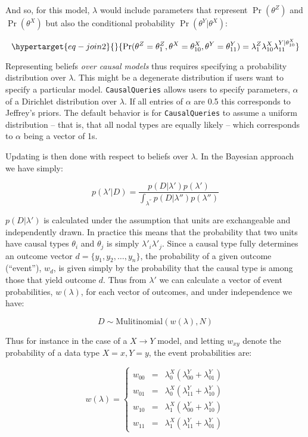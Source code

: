 \documentclass[
  11pt,
  article]{jss}
\begin{document}
And so, for this model, \(\lambda\) would include parameters that
represent \(\Pr(\theta^Z)\) and \(\Pr(\theta^X)\) but also the
conditional probability \(\Pr(\theta^Y|\theta^X)\):

\begin{equation}\protect\hypertarget{eq-join2}{}{
\Pr(\theta^Z = \theta^Z_1, \theta^X = \theta^X_{10}, \theta^Y = \theta^Y_{11}) = 
\lambda^Z_1\lambda^X_{10}\lambda^{Y|\theta^X_{10}}_{11}
}\label{eq-join2}\end{equation}

Representing beliefs \emph{over causal models} thus requires specifying
a probability distribution over \(\lambda\). This might be a degenerate
distribution if users want to specify a particular model.
\texttt{CausalQueries} allows users to specify parameters, \(\alpha\) of
a Dirichlet distribution over \(\lambda\). If all entries of \(\alpha\)
are 0.5 this corresponds to Jeffrey's priors. The default behavior is
for \texttt{CausalQueries} to assume a uniform distribution -- that is,
that all nodal types are equally likely -- which corresponds to
\(\alpha\) being a vector of 1s.

Updating is then done with respect to beliefs over \(\lambda\). In the
Bayesian approach we have simply:

\[p(\lambda'|D) = \frac{p(D|\lambda')p(\lambda')}{\int_{\lambda^{''}} p(D|\lambda'')p(\lambda'')}\]

\(p(D|\lambda')\) is calculated under the assumption that units are
exchangeable and independently drawn. In practice this means that the
probability that two units have causal types \(\theta_i\) and
\(\theta_j\) is simply \(\lambda'_i\lambda'_j\). Since a causal type
fully determines an outcome vector \(d = \{y_1, y_2,\dots,y_n\}\), the
probability of a given outcome (``event''), \(w_d\), is given simply by
the probability that the causal type is among those that yield outcome
\(d\). Thus from \(\lambda'\) we can calculate a vector of event
probabilities, \(w(\lambda)\), for each vector of outcomes, and under
independence we have:

\[D \sim \text{Mulitinomial}(w(\lambda), N)\]

Thus for instance in the case of a \(X \rightarrow Y\) model, and
letting \(w_{xy}\) denote the probability of a data type \(X=x, Y=y\),
the event probabilities are:

\[w(\lambda) = \left\{\begin{array}{ccc} w_{00} & = & \lambda^X_0(\lambda^Y_{00} + \lambda^Y_{01})\\ 
w_{01} & = & \lambda^X_0(\lambda^Y_{11} + \lambda^Y_{10})\\
w_{10} & = & \lambda^X_1(\lambda^Y_{00} + \lambda^Y_{10})\\
w_{11} & = & \lambda^X_1(\lambda^Y_{11} + \lambda^Y_{01})\end{array} \right.\]
\end{document}
